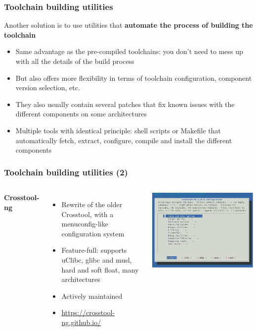 \begin{frame}
  \frametitle{Toolchain building utilities}
  Another solution is to use utilities that {\bf automate the process of
  building the toolchain}
  \begin{itemize}
  \item Same advantage as the pre-compiled toolchains: you don't need
    to mess up with all the details of the build process
  \item But also offers more flexibility in terms of toolchain
    configuration, component version selection, etc.
  \item They also usually contain several patches that fix known
    issues with the different components on some architectures
  \item Multiple tools with identical principle: shell scripts or
    Makefile that automatically fetch, extract, configure, compile and
    install the different components
\end{itemize}
\end{frame}

\begin{frame}
  \frametitle{Toolchain building utilities (2)}
  \begin{columns}
    {\bf Crosstool-ng}
    \begin{itemize}
      \item Rewrite of the older Crosstool, with a menuconfig-like configuration
	system
      \item Feature-full: supports uClibc, glibc and musl,
            hard and soft float, many architectures
      \item Actively maintained
      \item \url{https://crosstool-ng.github.io/}
    \end{itemize}
    \includegraphics[width=\textwidth]{slides/sysdev-toolchains-obtaining/ct-ng-menu.png}
  \end{columns}
\end{frame}

